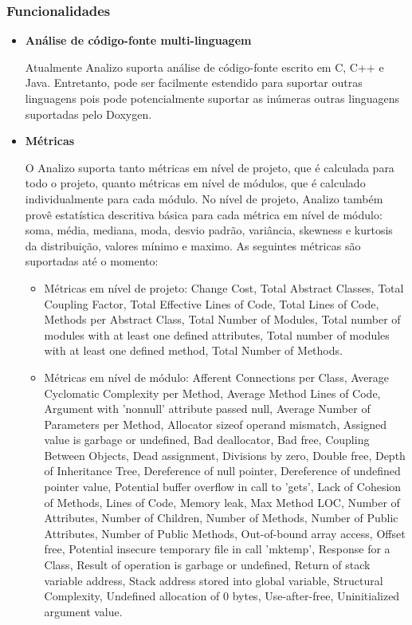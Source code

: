 \subsubsection{Funcionalidades}\label{funcionalidades}

\begin{itemize}

\item {\bf Análise de código-fonte multi-linguagem}

Atualmente Analizo suporta análise de código-fonte escrito em C, C++ e Java.
Entretanto, pode ser facilmente estendido para suportar outras linguagens pois
pode potencialmente suportar as inúmeras outras linguagens suportadas pelo Doxygen.

\item {\bf Métricas}\label{metricas}

O Analizo suporta tanto métricas em nível de projeto, que é calculada para todo o projeto,
quanto métricas em nível de módulos, que é calculado individualmente para cada módulo.
No nível de projeto, Analizo também provê estatística descritiva básica para cada métrica em
nível de módulo: soma, média, mediana, moda, desvio padrão, variância, skewness e kurtosis da
distribuição, valores mínimo e maximo. As seguintes métricas são suportadas até o momento:

\begin{itemize}

  \item Métricas em nível de projeto: Change Cost, Total Abstract Classes,
  Total Coupling Factor, Total Effective Lines of Code, Total Lines of Code,
  Methods per Abstract Class, Total Number of Modules, Total number of modules
  with at least one defined attributes, Total number of modules with at least
  one defined method, Total Number of Methods.

  \item Métricas em nível de módulo: Afferent Connections per Class, Average
  Cyclomatic Complexity per Method, Average Method Lines of Code, Argument with
  'nonnull' attribute passed null, Average Number of Parameters per Method,
  Allocator sizeof operand mismatch, Assigned value is garbage or undefined,
  Bad deallocator, Bad free, Coupling Between Objects, Dead assignment,
  Divisions by zero, Double free, Depth of Inheritance Tree, Dereference of
  null pointer, Dereference of undefined pointer value, Potential buffer
  overflow in call to 'gets', Lack of Cohesion of Methods, Lines of Code,
  Memory leak, Max Method LOC, Number of Attributes, Number of Children, Number
  of Methods, Number of Public Attributes, Number of Public Methods,
  Out-of-bound array access, Offset free, Potential insecure temporary file in
  call 'mktemp', Response for a Class, Result of operation is garbage or
  undefined, Return of stack variable address, Stack address stored into global
  variable, Structural Complexity, Undefined allocation of 0 bytes,
  Use-after-free, Uninitialized argument value.


\end{itemize}
\end{itemize}
